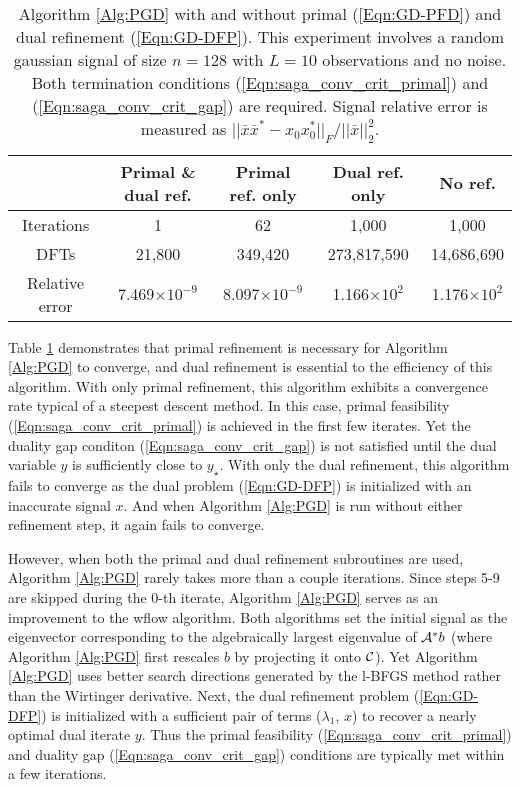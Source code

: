 \begin{table}[H]
\centering
\begin{tabular}{ |c|c|c|c|c| }
 \hline
	& Primal \& dual ref.
 			& Primal ref. only  &	Dual ref. only & No ref. \\
 \hline
 Iterations 		& 1	&  62 	&	1,000	&  1,000	\\
 DFTs 	& 21,800 	& 349,420 &	 273,817,590 	&  14,686,690	\\
 Relative error & 	7.469$\times 10^{-9}$		&	8.097$\times 10^{-9}$ &	1.166$\times 10^{2}$	& 	 1.176$\times 10^{2}$	\\
 \hline
\end{tabular}
\caption{Algorithm \ref{Alg:PGD} with and without primal (\ref{Eqn:GD-PFD}) and dual refinement (\ref{Eqn:GD-DFP}). This experiment involves a random gaussian signal of size $n = 128$ with $L = 10$ observations and no noise.  Both termination conditions (\ref{Eqn:saga_conv_crit_primal}) and (\ref{Eqn:saga_conv_crit_gap}) are required.  Signal relative error is measured as $|| \bar{x}\bar{x}^* - x_0x_0^* ||_F / ||\bar{x}||_2^2$.} \label{Tab:noiseless_runtimes}
\end{table}


Table \ref{Tab:noiseless_runtimes} demonstrates that primal refinement is necessary for Algorithm \ref{Alg:PGD} to converge, and dual refinement is essential to the efficiency of this algorithm.  With only primal refinement, this algorithm exhibits a convergence rate typical of a steepest descent method.   In this case, primal feasibility (\ref{Eqn:saga_conv_crit_primal}) is achieved in the first few iterates.  Yet the duality gap conditon (\ref{Eqn:saga_conv_crit_gap}) is not satisfied until the dual variable $y$ is sufficiently close to $y_\star$.  With only the dual refinement, this algorithm fails to converge as the dual problem (\ref{Eqn:GD-DFP}) is initialized with an inaccurate signal $x$.  And when Algorithm \ref{Alg:PGD} is run without either refinement step, it again fails to converge.  


However, when both the primal and dual refinement subroutines are used, Algorithm \ref{Alg:PGD} rarely takes more than a couple iterations.  Since steps 5-9 are skipped during the $0$-th iterate, Algorithm \ref{Alg:PGD} serves as an improvement to the wflow algorithm.  Both algorithms set the initial signal as the eigenvector corresponding to the algebraically largest eigenvalue of ${\mathcal A}^*b$ (where Algorithm \ref{Alg:PGD} first rescales $b$ by projecting it onto ${\mathcal C}$).  Yet Algorithm \ref{Alg:PGD} uses better search directions generated by the l-BFGS method rather than the Wirtinger derivative.  Next, the dual refinement problem (\ref{Eqn:GD-DFP}) is initialized with a sufficient pair of terms ($\lambda_1$, $x$) to recover a nearly optimal dual iterate $y$.  Thus the primal feasibility (\ref{Eqn:saga_conv_crit_primal}) and duality gap (\ref{Eqn:saga_conv_crit_gap}) conditions are typically met within a few iterations.  




